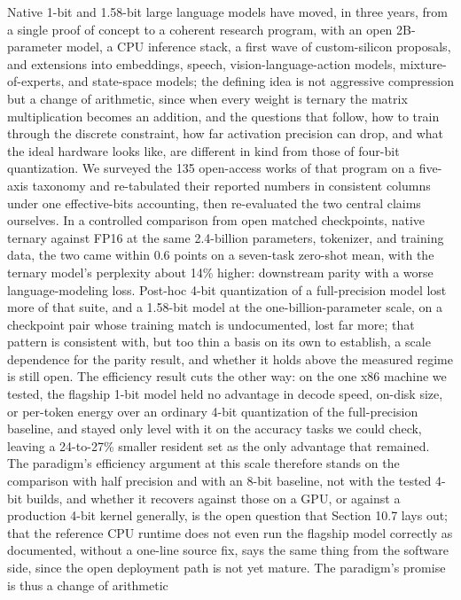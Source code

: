 \documentclass[11pt]{article}
\begin{document}
Native 1-bit and 1.58-bit large language models have moved, in three years, from a
single proof of concept to a coherent research program, with an open 2B-parameter model,
a CPU inference stack, a first wave of custom-silicon proposals, and extensions into
embeddings, speech, vision-language-action models, mixture-of-experts, and state-space
models; the defining idea is not aggressive compression but a change of arithmetic, since
when every weight is ternary the matrix multiplication becomes an addition, and the
questions that follow, how to train through the discrete constraint, how far activation
precision can drop, and what the ideal hardware looks like, are different in kind from
those of four-bit quantization. We surveyed the 135 open-access works of that program on
a five-axis taxonomy and re-tabulated their reported numbers in consistent columns under
one effective-bits accounting, then re-evaluated the two central claims ourselves. In a
controlled comparison from open matched checkpoints, native ternary against FP16 at the
same 2.4-billion parameters, tokenizer, and training data, the two came within 0.6 points
on a seven-task zero-shot mean, with the ternary model's perplexity about 14\% higher:
downstream parity with a worse language-modeling loss. Post-hoc 4-bit quantization of a
full-precision model lost more of that suite, and a 1.58-bit model at the
one-billion-parameter scale, on a checkpoint pair whose training match is undocumented,
lost far more; that pattern is consistent with, but too thin a basis on its own to
establish, a scale dependence for the parity result, and whether it holds above the
measured regime is still open. The efficiency result cuts the other way: on the one x86 machine we tested, the flagship
1-bit model held no advantage in decode speed, on-disk size, or per-token energy over an
ordinary 4-bit quantization of the full-precision baseline, and stayed only level with it
on the accuracy tasks we could check, leaving a 24-to-27\% smaller resident set as the only
advantage that remained. The paradigm's efficiency argument at this scale therefore
stands on the comparison with half precision and with an 8-bit baseline, not with the
tested 4-bit builds, and whether it recovers against those on a GPU, or against a
production 4-bit kernel generally, is the open question that Section 10.7 lays out; that the
reference CPU runtime does not even run the flagship model correctly as documented,
without a one-line source fix, says the same thing from the software side, since the open
deployment path is not yet mature. The paradigm's promise is thus a change of arithmetic
\end{document}
